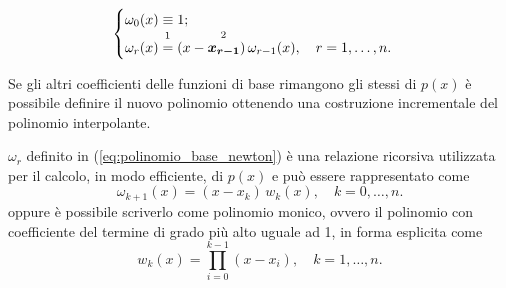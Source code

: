 \begin{definition}
	\begin{equation}\label{eq:polinomio_base_newton}
	    \begin{cases}
	        \omega_0(x)\equiv 1;\\
			\omega_r(x)\overset{\footnotemark}{=}(x-\overset{\footnotemark}{\boldsymbol{x_{r-1}}})\,\omega_{r-1}(x),\quad r=1,\hdots,n.
	    \end{cases}
	\end{equation}
\end{definition}
\addtocounter{footnote}{-1}


Se gli altri coefficienti delle funzioni di base rimangono gli stessi di $p(x)$ è possibile definire il nuovo polinomio ottenendo una costruzione incrementale del polinomio interpolante.

\begin{remark}
	$\omega_r$ definito in (\ref{eq:polinomio_base_newton}) è una relazione ricorsiva utilizzata per il calcolo, in modo efficiente, di $p(x)$ e può essere rappresentato come
	\begin{equation*}
	    \omega_{k+1}(x)=(x-x_k)\, w_k(x),\quad k=0,\hdots, n.
	\end{equation*}
	oppure è possibile scriverlo come polinomio monico, ovvero il polinomio con coefficiente del termine di grado più alto uguale ad 1, in forma esplicita come
	\begin{equation}\label{polinomio_base_newton2}
	    w_k(x)=\prod_{i=0}^{k-1}(x-x_i),\quad k=1,\hdots,n.
	\end{equation}
\end{remark}


